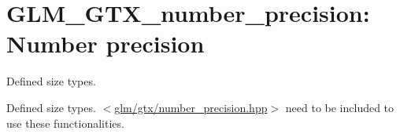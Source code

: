 \hypertarget{group__gtx__number__precision}{\section{\-G\-L\-M\-\_\-\-G\-T\-X\-\_\-number\-\_\-precision\-: \-Number precision}
\label{group__gtx__number__precision}
}


\-Defined size types.  


\-Defined size types. $<$\hyperlink{number__precision_8hpp}{glm/gtx/number\-\_\-precision.\-hpp}$>$ need to be included to use these functionalities. 